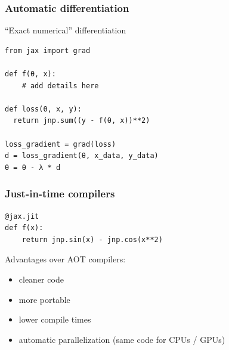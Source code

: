 \begin{frame}[fragile]
    \frametitle{Automatic differentiation}

    \vspace{0.5em}
    ``Exact numerical'' differentiation
    
    \begin{verbatim}
from jax import grad

def f(θ, x):
    # add details here

def loss(θ, x, y):
  return jnp.sum((y - f(θ, x))**2)

loss_gradient = grad(loss)
d = loss_gradient(θ, x_data, y_data)
θ = θ - λ * d

    \end{verbatim}

\end{frame}


\begin{frame}[fragile]
    \frametitle{Just-in-time compilers}

    \vspace{0.5em}
    
    \begin{verbatim}
@jax.jit
def f(x):
    return jnp.sin(x) - jnp.cos(x**2)
    \end{verbatim}

    \vspace{0.5em}
    \vspace{0.5em}
    Advantages over AOT compilers:

    \begin{itemize}
        \item cleaner code
    \vspace{0.5em}
        \item more portable
    \vspace{0.5em}
        \item lower compile times
    \vspace{0.5em}
        \item automatic parallelization (same code for CPUs / GPUs)
    \end{itemize}

\end{frame}



